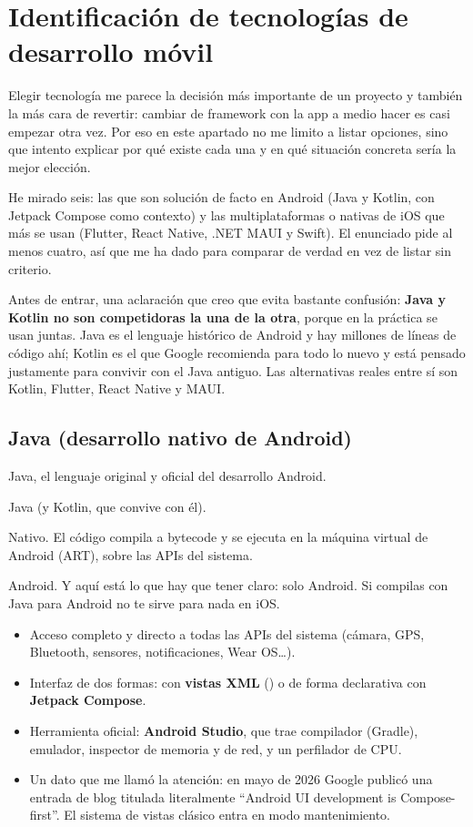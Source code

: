 \newpage
\section{Identificación de tecnologías de desarrollo móvil}

Elegir tecnología me parece la decisión más importante de un proyecto y también la más cara de revertir: cambiar de framework con la app a medio hacer es casi empezar otra vez. Por eso en este apartado no me limito a listar opciones, sino que intento explicar por qué existe cada una y en qué situación concreta sería la mejor elección.

He mirado seis: las que son solución de facto en Android (Java y Kotlin, con Jetpack Compose como contexto) y las multiplataformas o nativas de iOS que más se usan (Flutter, React Native, .NET MAUI y Swift). El enunciado pide al menos cuatro, así que me ha dado para comparar de verdad en vez de listar sin criterio.

Antes de entrar, una aclaración que creo que evita bastante confusión: \textbf{Java y Kotlin no son competidoras la una de la otra}, porque en la práctica se usan juntas. Java es el lenguaje histórico de Android y hay millones de líneas de código ahí; Kotlin es el que Google recomienda para todo lo nuevo y está pensado justamente para convivir con el Java antiguo. Las alternativas reales entre sí son Kotlin, Flutter, React Native y MAUI.

\subsection{Java (desarrollo nativo de Android)}

 Java, el lenguaje original y oficial del desarrollo Android.

 Java (y Kotlin, que convive con él).

 Nativo. El código compila a bytecode y se ejecuta en la máquina virtual de Android (ART), sobre las APIs del sistema.

 Android. Y aquí está lo que hay que tener claro: solo Android. Si compilas con Java para Android no te sirve para nada en iOS.

\begin{itemize}[leftmargin=*,itemsep=0.2em,topsep=0.2em]
  \item Acceso completo y directo a todas las APIs del sistema (cámara, GPS, Bluetooth, sensores, notificaciones, Wear OS\ldots).
  \item Interfaz de dos formas: con \textbf{vistas XML} () o de forma declarativa con \textbf{Jetpack Compose}.
  \item Herramienta oficial: \textbf{Android Studio}, que trae compilador (Gradle), emulador, inspector de memoria y de red, y un perfilador de CPU.
  \item Un dato que me llamó la atención: en mayo de 2026 Google publicó una entrada de blog titulada literalmente \enquote{Android UI development is Compose-first}. El sistema de vistas clásico entra en modo mantenimiento.
\end{itemize}

